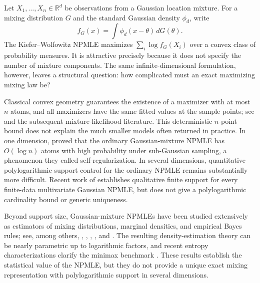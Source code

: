 \documentclass[11pt]{article}
\theoremstyle{definition}
\theoremstyle{remark}
\newcommand{\RR}{\mathbb R}
\begin{document}
Let $X_1,\ldots,X_n\in\RR^d$ be observations from a Gaussian location
mixture.  For a mixing distribution $G$ and the standard Gaussian density
$\phi_d$, write
\[
  f_G(x)=\int \phi_d(x-\theta)\,dG(\theta).
\]
The Kiefer--Wolfowitz NPMLE \citep{kieferwolfowitz1956} maximizes
$\sum_i\log f_G(X_i)$ over a convex class of probability measures.  It is attractive precisely because it does
not specify the number of mixture components.  The same infinite-dimensional
formulation, however, leaves a structural question: how complicated must an
exact maximizing mixing law be?

Classical convex geometry guarantees the existence of a maximizer with at
most $n$ atoms, and all maximizers have the same fitted values at the sample
points; see \citet{lindsay1983geometry} and the subsequent mixture-likelihood
literature.  This deterministic $n$-point bound does not explain the much
smaller models often returned in practice.  In one dimension,
\citet{polyanskiywu2020} proved that the ordinary Gaussian-mixture NPMLE has
$O(\log n)$ atoms with high probability under sub-Gaussian sampling, a
phenomenon they called self-regularization.  In several dimensions,
quantitative polylogarithmic support control for the ordinary NPMLE remains
substantially more difficult.  Recent work of \citet{wang2026} establishes
qualitative finite support for every finite-data multivariate Gaussian NPMLE,
but does not give a polylogarithmic cardinality bound or generic uniqueness.

Beyond support size, Gaussian-mixture NPMLEs have been studied extensively as
estimators of mixing distributions, marginal densities, and empirical Bayes
rules; see, among others, \citet{laird1978}, \citet{koenkermizera2014},
\citet{zhang2009}, \citet{sahaguntuboyina2020}, and
\citet{soloffetal2025}.  The resulting density-estimation theory can be nearly
parametric up to logarithmic factors, and recent entropy characterizations
clarify the minimax benchmark \citep{jiaetal2023}.  These results establish the
statistical value of the NPMLE, but they do not provide a unique exact mixing
representation with polylogarithmic support in several dimensions.
\end{document}
